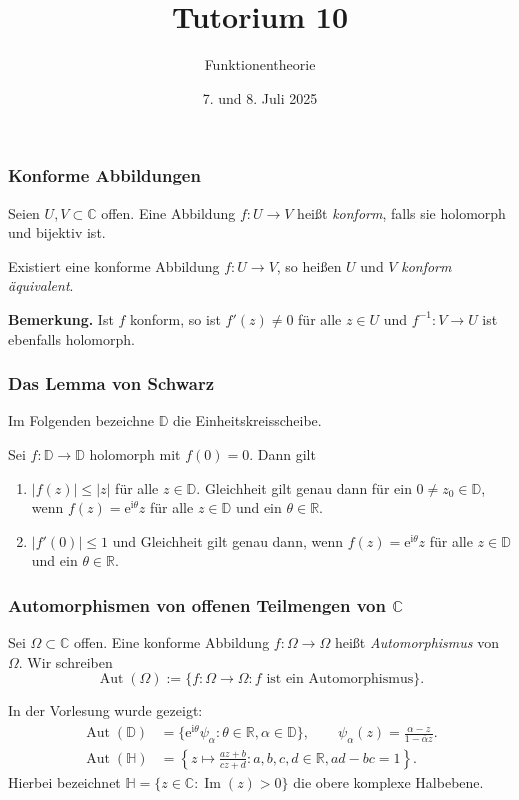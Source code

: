 \documentclass[10pt]{beamer}
\author[\url{https://fdf-uni.github.io/ft}]{}
\title{Tutorium 10}
\subtitle{\texorpdfstring{Funktionentheorie\vspace*{-1.5cm}}{Funktionentheorie}}
\date{7. und 8. Juli 2025}
\newcommand{\iu}{\mathrm{i}}
\renewcommand{\Im}{\operatorname{Im}}
\begin{document}
\begin{frame}
	\titlepage
\end{frame}
\begin{frame}
	\frametitle{Konforme Abbildungen}
	\begin{definition}
		Seien $U, V \subset \mathbb{C}$ offen.
		Eine Abbildung $f \colon U \to V$ heißt \emph{konform}, falls sie holomorph und bijektiv ist.

		\pause
		Existiert eine konforme Abbildung $f \colon U \to V$, so heißen $U$ und $V$ \emph{konform äquivalent}.
	\end{definition}
	\pause
	\textbf{Bemerkung.} Ist $f$ konform, so ist $f'(z) \neq 0$ für alle $z \in U$ und $f^{-1} \colon V \to U$ ist ebenfalls holomorph.
\end{frame}
\begin{frame}
	\frametitle{Das Lemma von Schwarz}
	\pause
	Im Folgenden bezeichne $\mathbb{D}$ die Einheitskreisscheibe.
	\pause
	\begin{lemma}
		Sei $f \colon \mathbb{D} \to \mathbb{D}$ holomorph mit $f(0) = 0$.
		Dann gilt
		\pause
		\begin{enumerate}
			\item $\lvert f(z) \rvert \le \lvert z \rvert$ für alle $z \in \mathbb{D}$.
			      Gleichheit gilt genau dann für ein $0 \neq z_0 \in \mathbb{D}$, wenn $f(z) = \mathrm{e}^{\iu \theta} z$ für alle $z \in \mathbb{D}$ und ein $\theta \in \mathbb{R}$.
			      \pause
			\item $\lvert f'(0) \rvert \le 1$ und Gleichheit gilt genau dann, wenn $f(z) = \mathrm{e}^{\mathrm{i} \theta} z$ für alle $z \in \mathbb{D}$ und ein $\theta \in \mathbb{R}$.
		\end{enumerate}
	\end{lemma}
\end{frame}
\begin{frame}
	\frametitle{Automorphismen von offenen Teilmengen von $\mathbb{C}$}
	\pause
	\begin{definition}
		Sei $\Omega \subset \mathbb{C}$ offen.
		Eine konforme Abbildung $f \colon \Omega \to \Omega$ heißt \emph{Automorphismus} von $\Omega$.
		Wir schreiben
		\[
			\operatorname{Aut}(\Omega) := \{f \colon \Omega \to \Omega : f \text{ ist ein Automorphismus} \}.
		\]
	\end{definition}
	\pause
	In der Vorlesung wurde gezeigt:
	\pause
	\begin{align*}
		\operatorname{Aut}(\mathbb{D}) & = \{\mathrm{e}^{\iu \theta} \psi_{\alpha} : \theta \in \mathbb{R}, \alpha \in \mathbb{D} \}, \qquad \psi_{\alpha}(z) = \frac{\alpha - z}{1 - \overline{\alpha} z}. \\
		\operatorname{Aut}(\mathbb{H}) & = \left\{ z \mapsto \frac{a z + b}{c z + d} : a, b, c, d \in \mathbb{R}, ad - bc = 1 \right\}.
	\end{align*}
	Hierbei bezeichnet $\mathbb{H} = \{z \in \mathbb{C} : \Im(z) > 0 \}$ die obere komplexe Halbebene.
\end{frame}
\end{document}
